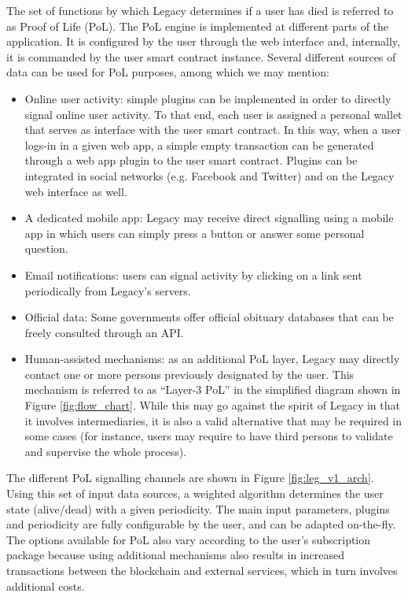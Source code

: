 The set of functions by which Legacy determines if a user has died is referred to as Proof of Life (PoL). The PoL engine is implemented at different parts of the application. It is configured by the user through the web interface and, internally, it is commanded by the user smart contract instance. Several different sources of data can be used for PoL purposes, among which we may mention:
\begin{itemize}
	\item Online user activity: simple plugins can be implemented in order to directly signal online user activity. To that end, each user is assigned a personal wallet that serves as interface with the user smart contract. In this way, when a user logs-in in a given web app, a simple empty transaction can be generated through a web app plugin to the user smart contract. Plugins can be integrated in social networks (e.g. Facebook and Twitter) and on the Legacy web interface as well.
	\item A dedicated mobile app: Legacy may receive direct signalling using a mobile app in which users can simply press a button or answer some personal question.
	\item Email notifications: users can signal activity by clicking on a link sent periodically from Legacy’s servers. 
	\item Official data: Some governments offer official obituary databases that can be freely consulted through an API.  
	\item Human-assisted mechanisms: as an additional PoL layer, Legacy may directly contact one or more persons previously designated by the user. This mechanism is referred to as ``Layer-3 PoL'' in the simplified diagram shown in Figure \ref{fig:flow_chart}. While this may go against the spirit of Legacy in that it involves intermediaries, it is also a valid alternative that may be required in some cases (for instance, users may require to have third persons to validate and supervise the whole process).
\end{itemize}

The different PoL signalling channels are shown in Figure \ref{fig:leg_v1_arch}. Using this set of input data sources, a weighted algorithm determines the user state (alive/dead) with a given periodicity. The main input parameters, plugins and periodicity are fully configurable by the user, and can be adapted on-the-fly. The options available for PoL also vary according to the user’s subscription package because using additional mechanisms also results in increased transactions between the blockchain and external services, which in turn involves additional costs. 

